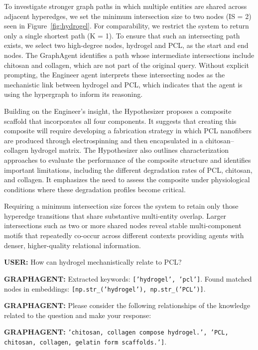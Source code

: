 \documentclass{article}
\begin{document}
To investigate stronger graph paths in which multiple entities are shared across adjacent hyperedges, we set the minimum intersection size to two nodes (IS = 2) seen in Figure~\ref{fig:hydrogel}. For comparability, we restrict the system to return only a single shortest path (K = 1). To ensure that such an intersecting path exists, we select two high-degree nodes, hydrogel and PCL, as the start and end nodes. The GraphAgent identifies a path whose intermediate intersections include chitosan and collagen, which are not part of the original query. Without explicit prompting, the Engineer agent interprets these intersecting nodes as the mechanistic link between hydrogel and PCL, which indicates that the agent is using the hypergraph to inform its reasoning. 

Building on the Engineer's insight, the Hypothesizer proposes a composite scaffold that incorporates all four components. It suggests that creating this composite will require developing a fabrication strategy in which PCL nanofibers are produced through electrospinning and then encapsulated in a chitosan–collagen hydrogel matrix. The Hypothesizer also outlines characterization approaches to evaluate the performance of the composite structure and identifies important limitations, including the different degradation rates of PCL, chitosan, and collagen. It emphasizes the need to assess the composite under physiological conditions where these degradation profiles become critical.

Requiring a minimum intersection size forces the system to retain only those hyperedge transitions that share substantive multi-entity overlap. Larger intersections such as two or more shared nodes reveal stable multi-component motifs that repeatedly co-occur across different contexts providing agents with denser, higher-quality relational information. 






\begin{rightbubbles}
\textbf{USER:} How can hydrogel mechanistically relate to PCL? 
\end{rightbubbles}

\begin{leftbubbles}
\textbf{GRAPHAGENT:} Extracted keywords: \texttt{['hydrogel', 'pcl']}. 
Found matched nodes in embeddings: \texttt{[np.str\_('hydrogel'), np.str\_('PCL')]}.

\textbf{GRAPHAGENT:} Please consider the following relationships of the knowledge related to the question and make your response: 

\textbf{GRAPHAGENT:} \texttt{'chitosan, collagen compose hydrogel.', 'PCL, chitosan, collagen, gelatin form scaffolds.']}.
\end{leftbubbles}
\end{document}
